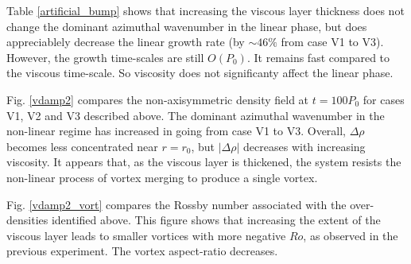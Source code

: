 Table \ref{artificial_bump} shows that increasing the viscous layer thickness does not
change the dominant azimuthal wavenumber in the linear phase, but does appreciablely decrease the 
linear growth rate (by $\sim 46\%$ from case V1 to V3). However, the growth time-scales are still
$O(P_0)$.  It remains fast compared to the viscous time-scale. So
viscosity does not significanty affect the linear phase.  

Fig. \ref{vdamp2} compares the non-axisymmetric density field at
$t=100P_0$ for cases V1, V2 and V3 described above. 
The dominant azimuthal wavenumber in the non-linear regime has increased in going from case
V1 to V3. Overall, $\Delta\rho$ becomes less concentrated near $r=r_0$, but $|\Delta\rho|$
decreases with increasing viscosity. It appears that, as the viscous layer is thickened,  
the system resists the non-linear process of vortex merging to produce a single vortex. 

Fig. \ref{vdamp2_vort} compares the Rossby number associated with the
over-densities identified above. This figure shows
that increasing the extent of the viscous layer leads to smaller 
vortices with more negative $Ro$, as observed in the previous experiment. The vortex aspect-ratio 
decreases.   


